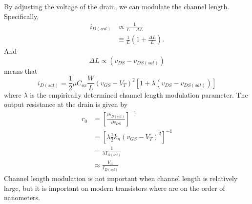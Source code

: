 \documentclass[nobib]{tufte-handout}
\begin{document}
By adjusting the voltage of the drain, we 
can modulate the channel length. Specifically, 
\begin{align} \label{eq:13}
    i_{D(sat)} &\propto \frac{1}{L-\Delta L} \\
    &\equiv \frac{1}{L}\left(1 + \frac{\Delta L}{L}\right).
\end{align}
And 
\begin{equation} \label{eq:14}
    \Delta L \propto (v_{DS} - v_{DS(sat)})
\end{equation}
means that 
\begin{equation} \label{eq:15}
    i_{D(sat)} = \frac{1}{2} \mu C_{ox} \frac{W}{L} (v_{GS}-V_T)^2 \left[1 + \lambda(v_{DS}-v_{DS(sat)})\right]
\end{equation}
where $\lambda$ is the empirically determined 
channel length modulation parameter. 
The output resistance at the drain is given by 
\begin{align} \label{eq:16}
    r_0 &= \left[\frac{\partial i_{D(sat)}}{\partial v_{DS}}\right]^{-1} \\
    &= \left[\lambda \frac{1}{2} k_n (v_{GS}-V_T)^2\right]^{-1} \\
    &= \frac{1}{\lambda I_{D(sat)}} \\
    &\approx \frac{V_A}{I_{D(sat)}}
\end{align}
Channel length modulation is not important when 
channel length is relatively large, but it is important 
on modern transistors where are on the order of nanometers. 
\end{document}
